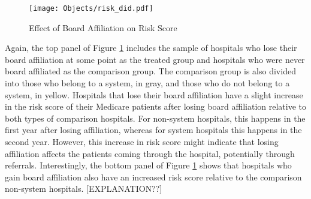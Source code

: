 \documentclass[12pt]{article}
\begin{document}
    \begin{figure}[ht!]
        \centering
        \caption{Effect of Board Affiliation on Risk Score}
        \texttt{[image: Objects/risk\_did.pdf]}
        \label{fig:risk_did}
    \end{figure}

    Again, the top panel of Figure \ref{fig:risk_did} includes the sample of hospitals who lose their board affiliation at some point as the treated group and hospitals who were never board affiliated as the comparison group. The comparison group is also divided into those who belong to a system, in gray, and those who do not belong to a system, in yellow. Hospitals that lose their board affiliation have a slight increase in the risk score of their Medicare patients after losing board affiliation relative to both types of comparison hospitals. For non-system hospitals, this happens in the first year after losing affiliation, whereas for system hospitals this happens in the second year. However, this increase in risk score might indicate that losing affiliation affects the patients coming through the hospital, potentially through referrals. Interestingly, the bottom panel of Figure \ref{fig:risk_did} shows that hospitals who gain board affiliation also have an increased risk score relative to the comparison non-system hospitals. [EXPLANATION??]

    

    \newpage


    \printbibliography


    

    

    

    

    

	
	
	
\end{document}
